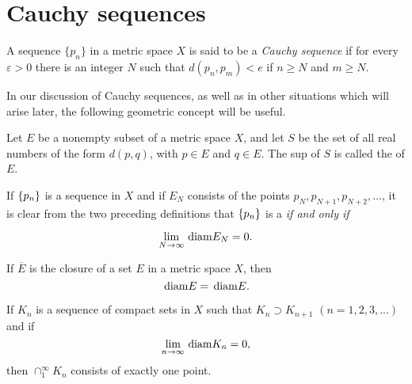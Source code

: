 \section{Cauchy sequences}
\begin{mydef}
    \label{mydef:3.8}
    A sequence $\{p_n\}$ in a metric space $X$ is said to be a \emph{Cauchy sequence} if for every $\varepsilon > 0$ there is an integer $N$ such that $d(p_n, p_m) <e$ if $n \geq N$ and $m \geq N$. 
\end{mydef}

In our discussion of Cauchy sequences, as well as in other situations
which will arise later, the following geometric concept will be useful.

\begin{mydef}
    \label{mydef:3.9}
    Let $E$ be a nonempty subset of a metric space $X$, and let $S$ be the set of all real numbers of the form $d(p, q)$, with $p \in E$ and $q \in E$. The sup of $S$ is called the  of $E$.    
\end{mydef}

If $\protect\{p_n\}$ is a sequence in $X$ and if $E_N$ consists of the points $p_N, p_{N+1}, p_{N+2},\dots$, it is clear from the two preceding definitions that $\protect\{p_n\}$ is a  \emph{if and only if}

\begin{equation*}
    \lim_{N \to \infty} \protect\mathop{}\mathrm{diam} E_N = 0.
\end{equation*}

\begin{thm}
    \label{thm:3.10}
    \begin{asparaenum}[(a)]
        \item If $\overline{E}$ is the closure of a set $E$ in a metric space $X$, then 
        \begin{equation*}
            \protect\mathop{}\mathrm{diam} E = \protect\mathop{}\mathrm{diam} E.
        \end{equation*}
        \item If $K_n$ is a sequence of compact sets in $X$ such that $K_n \supset K_{n+1} $ $(n=1,2,3,...) $and if
        \begin{equation*}
            \lim_{n \to \infty} \protect\mathop{}\mathrm{diam} K_n = 0,
        \end{equation*}
        then $\cap_1^\infty K_n$ consists of exactly one point.
    \end{asparaenum}
\end{thm}

